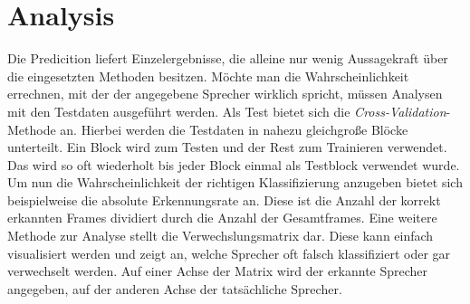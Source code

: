 \section{Analysis}
Die Predicition liefert Einzelergebnisse, die alleine nur wenig Aussagekraft über die eingesetzten Methoden besitzen. Möchte man die Wahrscheinlichkeit errechnen, mit der der angegebene Sprecher wirklich spricht, müssen Analysen mit den Testdaten ausgeführt werden. Als Test bietet sich die \emph{Cross-Validation}-Methode an. Hierbei werden die Testdaten in nahezu gleichgroße Blöcke unterteilt. Ein Block wird zum Testen und der Rest zum Trainieren verwendet. Das wird so oft wiederholt bis jeder Block einmal als Testblock verwendet wurde. Um nun die Wahrscheinlichkeit der richtigen Klassifizierung anzugeben bietet sich beispielweise die absolute Erkennungsrate an. Diese ist die Anzahl der korrekt erkannten Frames dividiert durch die Anzahl der Gesamtframes. Eine weitere Methode zur Analyse stellt die Verwechslungsmatrix dar. Diese kann einfach visualisiert werden und zeigt an, welche Sprecher oft falsch klassifiziert oder gar verwechselt werden. Auf einer Achse der Matrix wird der erkannte Sprecher angegeben, auf der anderen Achse der tatsächliche Sprecher.



